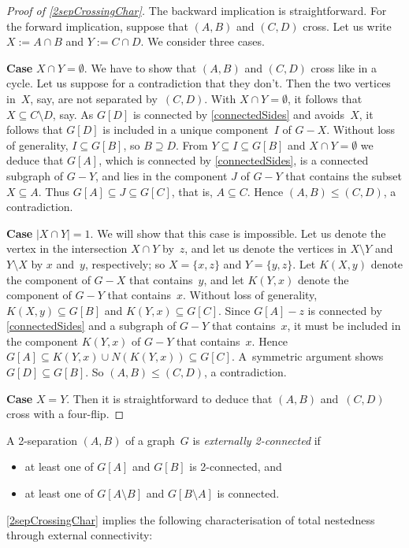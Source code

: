 \documentclass{aic}
\newcommand{\se}{\subseteq}
\newcommand{\tn}{externally 2-connected}
\theoremstyle{plain}
\theoremstyle{definition}
\theoremstyle{plain}
\theoremstyle{plain}
\newcommand{\sm}{\setminus}
\renewcommand{\le}{\leqslant}
\begin{document}
\begin{proof}[Proof of \autoref{2sepCrossingChar}]
The backward implication is straightforward.
For the forward implication, suppose that $(A,B)$ and $(C,D)$ cross.
Let us write $X:=A\cap B$ and $Y:=C\cap D$.
We consider three cases.

\textbf{Case} $X\cap Y=\emptyset$.
We have to show that $(A,B)$ and $(C,D)$ cross like in a cycle.
Let us suppose for a contradiction that they don't.
Then the two vertices in~$X$, say, are not separated by~$(C,D)$.
With $X\cap Y=\emptyset$, it follows that $X\se C\sm D$, say.
As $G[D]$ is connected by \autoref{connectedSides} and avoids~$X$, it follows that $G[D]$ is included in a unique component~$I$ of $G-X$.
Without loss of generality, $I\se G[B]$, so $B\supseteq D$.
From $Y\se I\se G[B]$ and $X\cap Y=\emptyset$ we deduce that $G[A]$, which is connected by \autoref{connectedSides}, is a connected subgraph of $G-Y$, and lies in the component $J$ of $G-Y$ that contains the subset $X\se A$.
Thus $G[A]\se J\se G[C]$, that is, $A\se C$.
Hence $(A,B)\le (C,D)$, a contradiction.


\textbf{Case} $|X\cap Y|=1$.
We will show that this case is impossible.
Let us denote the vertex in the intersection $X\cap Y$ by~$z$, and let us denote the vertices in $X\sm Y$ and $Y\sm X$ by $x$ and~$y$, respectively; so $X=\{x,z\}$ and $Y=\{y,z\}$.
Let $K(X,y)$ denote the component of $G-X$ that contains~$y$, and let $K(Y,x)$ denote the component of $G-Y$ that contains~$x$.
Without loss of generality, $K(X,y)\se G[B]$ and $K(Y,x)\se G[C]$.
Since $G[A]-z$ is connected by \autoref{connectedSides} and a subgraph of $G-Y$ that contains~$x$, it must be included in the component $K(Y,x)$ of $G-Y$ that contains~$x$.
Hence $G[A]\se K(Y,x)\cup N(K(Y,x))\se G[C]$.
A~symmetric argument shows $G[D]\se G[B]$.
So $(A,B)\le (C,D)$, a contradiction.

\textbf{Case} $X=Y$. Then it is straightforward to deduce that $(A,B)$ and~$(C,D)$ cross with a four-flip.
\end{proof}



A 2-separation $(A,B)$ of a graph~$G$ is \emph{\tn} if
\begin{itemize}
    \item at least one of $G[A]$ and $G[B]$ is 2-connected, and
    \item at least one of $G[A\sm B]$ and $G[B\sm A]$ is connected.
\end{itemize}
\autoref{2sepCrossingChar} implies the following characterisation of total nestedness through external connectivity:
\end{document}
